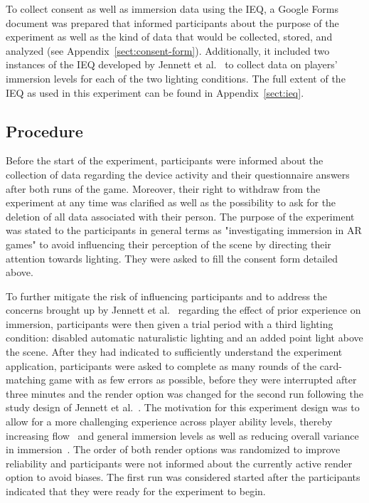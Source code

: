 \documentclass[12pt,twoside,english]{article}
\begin{document}
To collect consent as well as immersion data using the \gls{IEQ}, a Google Forms document was prepared that informed participants about the purpose of the experiment as well as the kind of data that would be collected, stored, and analyzed (see Appendix~\ref{sect:consent-form}).
Additionally, it included two instances of the \gls{IEQ} developed by Jennett et al.~\cite{jennett_measuring_2008} to collect data on players' immersion levels for each of the two lighting conditions.
The full extent of the \gls{IEQ} as used in this experiment can be found in Appendix~\ref{sect:ieq}.

\subsection{Procedure}
\label{sect:procedure}

Before the start of the experiment, participants were informed about the collection of data regarding the device activity and their questionnaire answers after both runs of the game.
Moreover, their right to withdraw from the experiment at any time was clarified as well as the possibility to ask for the deletion of all data associated with their person.
The purpose of the experiment was stated to the participants in general terms as "investigating immersion in \gls{AR} games" to avoid influencing their perception of the scene by directing their attention towards lighting. 
They were asked to fill the consent form detailed above.

To further mitigate the risk of influencing participants and to address the concerns brought up by Jennett et al.~\cite{jennett_measuring_2008} regarding the effect of prior experience on immersion, participants were then given a trial period with a third lighting condition: disabled automatic naturalistic lighting and an added point light above the scene.
After they had indicated to sufficiently understand the experiment application, participants were asked to complete as many rounds of the card-matching game with as few errors as possible, before they were interrupted after three minutes and the render option was changed for the second run following the study design of Jennett et al.~\cite{jennett_measuring_2008}.
The motivation for this experiment design was to allow for a more challenging experience across player ability levels, thereby increasing flow~\cite{csikszentmihalyi_flow_1990} and general immersion levels as well as reducing overall variance in immersion~\cite{jennett_measuring_2008}.
The order of both render options was randomized to improve reliability and participants were not informed about the currently active render option to avoid biases.
The first run was considered started after the participants indicated that they were ready for the experiment to begin.
\end{document}
